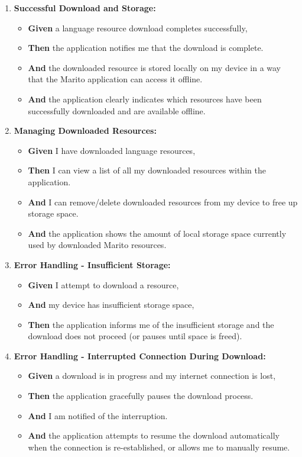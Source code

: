 \documentclass[12pt]{article}
\begin{document}
\begin{enumerate}
    \item \textbf{Successful Download and Storage:}
    \begin{itemize}
        \item \textbf{Given} a language resource download completes successfully,
        \item \textbf{Then} the application notifies me that the download is complete.
        \item \textbf{And} the downloaded resource is stored locally on my device in a way that the Marito application can access it offline.
        \item \textbf{And} the application clearly indicates which resources have been successfully downloaded and are available offline.
    \end{itemize}

    \item \textbf{Managing Downloaded Resources:}
    \begin{itemize}
        \item \textbf{Given} I have downloaded language resources,
        \item \textbf{Then} I can view a list of all my downloaded resources within the application.
        \item \textbf{And} I can remove/delete downloaded resources from my device to free up storage space.
        \item \textbf{And} the application shows the amount of local storage space currently used by downloaded Marito resources.
    \end{itemize}

    \item \textbf{Error Handling - Insufficient Storage:}
    \begin{itemize}
        \item \textbf{Given} I attempt to download a resource,
        \item \textbf{And} my device has insufficient storage space,
        \item \textbf{Then} the application informs me of the insufficient storage and the download does not proceed (or pauses until space is freed).
    \end{itemize}

    \item \textbf{Error Handling - Interrupted Connection During Download:}
    \begin{itemize}
        \item \textbf{Given} a download is in progress and my internet connection is lost,
        \item \textbf{Then} the application gracefully pauses the download process.
        \item \textbf{And} I am notified of the interruption.
        \item \textbf{And} the application attempts to resume the download automatically when the connection is re-established, or allows me to manually resume.
    \end{itemize}


\end{enumerate}
\end{document}
